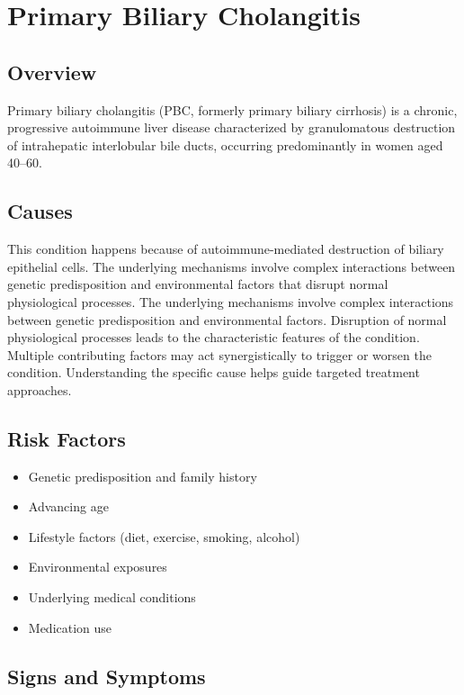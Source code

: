 \chapter{Primary Biliary Cholangitis}
\label{sec:Primary Biliary Cholangitis}

\section{Overview}
Primary biliary cholangitis (PBC, formerly primary biliary cirrhosis) is a chronic, progressive autoimmune liver disease characterized by granulomatous destruction of intrahepatic interlobular bile ducts, occurring predominantly in women aged 40--60.
\section{Causes}
This condition happens because of autoimmune-mediated destruction of biliary epithelial cells. The underlying mechanisms involve complex interactions between genetic predisposition and environmental factors that disrupt normal physiological processes. The underlying mechanisms involve complex interactions between genetic predisposition and environmental factors. Disruption of normal physiological processes leads to the characteristic features of the condition. Multiple contributing factors may act synergistically to trigger or worsen the condition. Understanding the specific cause helps guide targeted treatment approaches.
\section{Risk Factors}


\begin{itemize}[noitemsep]
  \item Genetic predisposition and family history
  \item Advancing age
  \item Lifestyle factors (diet, exercise, smoking, alcohol)
  \item Environmental exposures
  \item Underlying medical conditions
  \item Medication use
\end{itemize}
\section{Signs and Symptoms}

